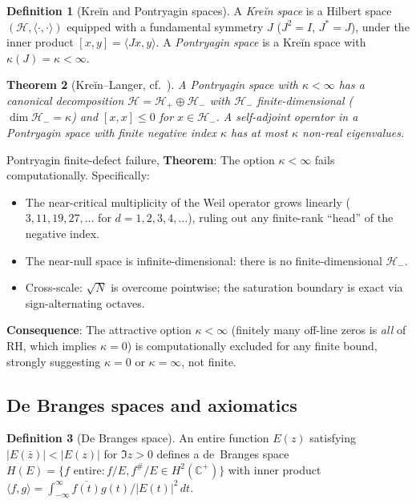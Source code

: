 \documentclass[11pt]{amsart}
\newtheorem{theorem}{Theorem}[section]
\theoremstyle{definition}
\newtheorem{definition}[theorem]{Definition}
\theoremstyle{remark}
\newcommand{\kap}{\kappa}
\begin{document}
\begin{definition}[Kreĭn and Pontryagin spaces]
A \emph{Kreĭn space} is a Hilbert space $(\mathcal{H}, \langle\cdot,\cdot\rangle)$
equipped with a fundamental symmetry $J$ ($J^2=I$, $J^*=J$), under the inner product
$[x,y] = \langle Jx,y\rangle$.  A \emph{Pontryagin space} is a Kreĭn space with
$\kap(J)=\kap<\infty$.
\end{definition}

\begin{theorem}[Kreĭn--Langer, cf.~\cite{RP25}]
\label{thm:KL}
A Pontryagin space with $\kap<\infty$ has a canonical decomposition
$\mathcal{H} = \mathcal{H}_+\oplus\mathcal{H}_-$ with $\mathcal{H}_-$
finite-dimensional ($\dim\mathcal{H}_- = \kap$) and $[x,x]\le 0$ for $x\in\mathcal{H}_-$.
A self-adjoint operator in a Pontryagin space with finite negative index $\kap$
has at most $\kap$ non-real eigenvalues.
\end{theorem}

\begin{nogobox}{Pontryagin finite-defect failure, \cite{RP16}}
\textbf{Theorem}: The option $\kap<\infty$ fails computationally.  Specifically:
\begin{itemize}
  \item The near-critical multiplicity of the Weil operator grows linearly
    ($3, 11, 19, 27, \ldots$ for $d=1,2,3,4,\ldots$), ruling out any finite-rank
    ``head'' of the negative index.
  \item The near-null space is infinite-dimensional: there is no finite-dimensional
    $\mathcal{H}_-$.
  \item Cross-scale: $\sqrt{N}$ is overcome pointwise; the saturation boundary is
    exact via sign-alternating octaves.
\end{itemize}
\textbf{Consequence}: The attractive option $\kap<\infty$ (finitely many off-line
zeros is \emph{all} of RH, which implies $\kap=0$) is computationally excluded
for any finite bound, strongly suggesting $\kap = 0$ or $\kap = \infty$, not finite.
\end{nogobox}

\subsection{De Branges spaces and axiomatics}

\begin{definition}[De Branges space]
An entire function $E(z)$ satisfying $|E(\bar z)| < |E(z)|$ for $\Im z > 0$
defines a de~Branges space $H(E) = \{f \text{ entire}: f/E, f^\#/E\in H^2(\mathbb{C}^+)\}$
with inner product $\langle f,g\rangle = \int_{-\infty}^\infty \overline{f(t)}g(t)/|E(t)|^2\,dt$.
\end{definition}
\end{document}
